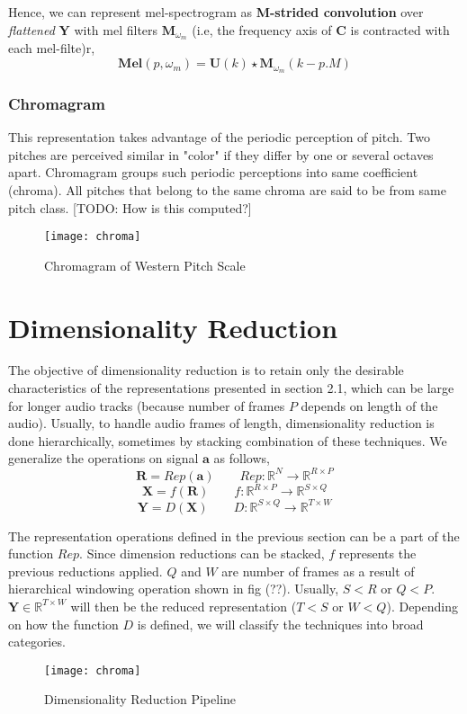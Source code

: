 \noindent Hence, we can represent mel-spectrogram as \textbf{M-strided convolution} over \textit{flattened} $\textbf{Y}$ with mel filters $\textbf{M}_{\omega_{m}}$ (i.e, the frequency axis of $\textbf{C}$ is contracted with each mel-filte)r, 
\begin{equation}
\boxed
{
  \textbf{Mel}(p, \omega_{m} ) = \textbf{U}(k) \star \textbf{M}_{\omega_{m}}(k - p.M)
}
\end{equation}
  
\subsubsection{Chromagram}

This representation takes advantage of the periodic perception of pitch. Two pitches are perceived similar in "color" if they differ by one or several octaves apart. Chromagram groups such periodic perceptions into same coefficient (chroma). All pitches that belong to the same chroma are said to be from same pitch class. [TODO: How is this computed?]
\begin{figure}[h] 
\centering
\texttt{[image: chroma]}
\caption{Chromagram of Western Pitch Scale}
 \label{fig:Chromagram}
 \end{figure}
\FloatBarrier
\bigskip

\section{Dimensionality Reduction}
The objective of dimensionality reduction is to retain only the desirable characteristics of the representations presented in section 2.1, which can be large for longer audio tracks (because number of frames $P$ depends on length of the audio). Usually, to handle audio frames of  length, dimensionality reduction is done hierarchically, sometimes by stacking combination of these techniques. We generalize the operations on signal $\textbf{a}$ as follows,
\[
   \textbf{R} = Rep(\textbf{a}) \qquad Rep : \mathbb{R}^{N} \rightarrow \mathbb{R}^{R \times P}
\]
\[
   \textbf{X} = f(\textbf{R}) \qquad f : \mathbb{R}^{R \times P} \rightarrow \mathbb{R}^{S \times Q} 
\]
\[
   \textbf{Y} = D(\textbf{X}) \qquad D : \mathbb{R}^{S \times Q} \rightarrow \mathbb{R}^{T \times W} 
\] 

\noindent The representation operations defined in the previous section can be a part of the function $Rep$. Since dimension reductions can be stacked, $f$ represents the previous reductions applied. $Q$ and $W$ are number of frames as a result of hierarchical windowing operation shown in fig (??). Usually, $S < R$ or $Q < P$. $\textbf{Y} \in \mathbb{R}^{T \times W}$ will then be the reduced representation ($T < S$ or $W < Q$). Depending on how the function $D$ is defined, we will classify the techniques into broad categories. 
\begin{figure}[h] 
\centering
\texttt{[image: chroma]}
\caption{Dimensionality Reduction Pipeline}
 \label{fig:Dimensionality Reduction}
 \end{figure}
\FloatBarrier
\bigskip


